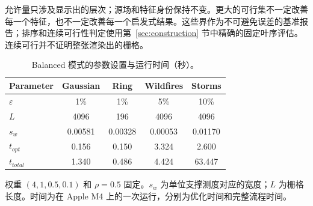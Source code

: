 \documentclass[fontset=none,zihao=5,a4paper]{ctexart}
\begin{document}
允许量只涉及显示出的层次；源场和特征身份保持不变。更大的可行集不一定改善每一个特征，也不一定改善每一个启发式结果。这些界作为不可避免误差的基准报告；排序和连续可行性判定使用第~\ref{sec:construction} 节中精确的固定叶序评估。连续可行并不证明整张渲染出的栅格。

\begin{table}[htbp]
\centering
\caption{Balanced 模式的参数设置与运行时间（秒）。}\label{tab:anchor-parameters-final}
\footnotesize\setlength{\tabcolsep}{3pt}
\begin{tabular}{@{}lcccc@{}}
\toprule
Parameter & Gaussian & Ring & Wildfires & Storms \\
\midrule
$\varepsilon$ & 1\% & 1\% & 5\% & 10\% \\
$L$ & 4096 & 196 & 4096 & 4096 \\
$s_w$ & 0.00581 & 0.00328 & 0.00053 & 0.01170 \\
$t_{opt}$ & 0.156 & 0.150 & 3.324 & 2.600 \\
$t_{total}$ & 1.340 & 0.486 & 4.424 & 63.447 \\
\bottomrule
\end{tabular}
\par\smallskip
\parbox{\linewidth}{\footnotesize 权重 $(4,1,0.5,0.1)$ 和 $\rho=0.5$ 固定。$s_w$ 为单位支撑测度对应的宽度；$L$ 为栅格长度。时间为在 Apple M4 上的一次运行，分别为优化时间和完整流程时间。}
\end{table}
\end{document}
